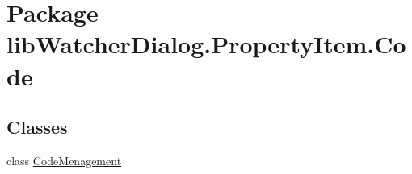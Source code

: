 \hypertarget{namespacelib_watcher_dialog_1_1_property_item_1_1_code}{\section{Package lib\+Watcher\+Dialog.\+Property\+Item.\+Code}
\label{namespacelib_watcher_dialog_1_1_property_item_1_1_code}
}
\subsection*{Classes}
\begin{DoxyCompactItemize}
\item 
class \hyperlink{classlib_watcher_dialog_1_1_property_item_1_1_code_1_1_code_menagement}{Code\+Menagement}
\end{DoxyCompactItemize}
